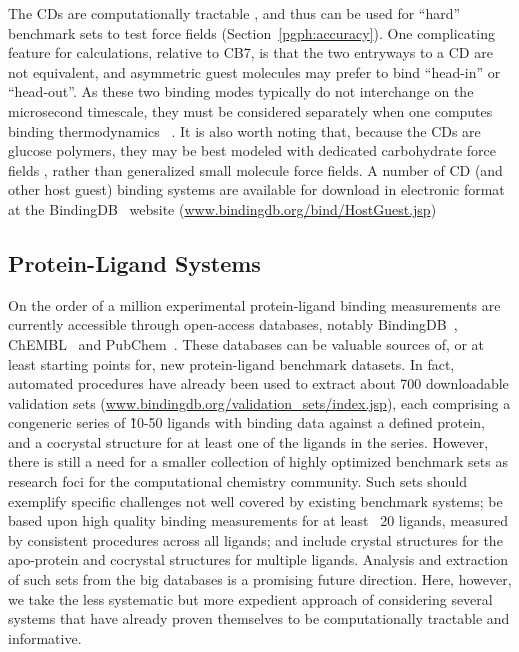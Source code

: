 \documentclass[aps,pre,twocolumn,nofootinbib,superscriptaddress,10pt, final,tightenlines]{revtex4-1}
\begin{document}
The CDs are computationally tractable \cite{Mark:1994:J.Am.Chem.Soc., Luzhkov:1999:ChemicalPhysicsLetters, Bea:2002:TheorChemAcc, Chen:2004:BiophysicalJournal, Sellner:2008:J.Phys.Chem.B, Cai:2009:J.Phys.Chem.B, Wickstrom:2013:J.Chem.TheoryComput., Shi:2014:TheorChemAcc, henriksen_computational_2015, Zhang:2015:J.Chem.TheoryComput., Khuntawee:2016:CarbohydratePolymers, Gebhardt:2016:FluidPhaseEquilibria, wickstrom_parameterization_2016}, and thus can be used for ``hard'' benchmark sets to test force fields (Section~\ref{pgph:accuracy}). 
One complicating feature for calculations, relative to CB7, is that the two entryways to a CD are not equivalent, and asymmetric guest molecules may prefer to bind ``head-in'' or ``head-out''.
As these two binding modes typically do not interchange on the microsecond timescale, they must be considered separately when one computes binding thermodynamics ~\cite{henriksen_computational_2015}.
It is also worth noting that, because the CDs are glucose polymers, they may be best modeled with dedicated carbohydrate force fields \cite{Kirschner:2008:J.Comput.Chem., Cezard:2011:PhysicalChemistryChemicalPhysics, Guvench:2011:J.Chem.TheoryComput., Xiong:2015:CarbohydrateResearch}, rather than generalized small molecule force fields. 
A number of CD (and other host guest) binding systems are available for download in electronic format at the BindingDB~\cite{Liu:2007:Nucl.AcidsRes., Gilson:2016:Nucl.AcidsRes.} website (\url{www.bindingdb.org/bind/HostGuest.jsp})

\subsection{Protein-Ligand Systems}
On the order of a million experimental protein-ligand binding measurements are currently accessible through open-access databases, notably BindingDB~\cite{Liu:2007:Nucl.AcidsRes.}, ChEMBL~\cite{Bento:2014:NuclAcidsRes} and PubChem~\cite{Kim:2016:NucleicAcidsRes.}.
These databases can be valuable sources of, or at least starting points for, new protein-ligand benchmark datasets.
In fact, automated procedures have already been used to extract about 700 downloadable validation sets (\url{www.bindingdb.org/validation\_sets/index.jsp}), each
comprising a congeneric series of \~10-50 ligands with binding data against a defined protein, and a cocrystal structure for at least one of the ligands in the series.
However, there is still a need for a smaller collection of highly optimized benchmark sets as research foci for the computational chemistry community.
Such sets should exemplify specific challenges not well covered by existing benchmark systems; be based upon high quality binding measurements for at least ~20 ligands, measured by consistent procedures across all ligands; and include crystal structures for the apo-protein and cocrystal structures for multiple ligands.
Analysis and extraction of such sets from the big databases is a promising future direction.
Here, however, we take the less systematic but more expedient approach of considering several systems that have already proven themselves to be computationally tractable and informative.
\end{document}

